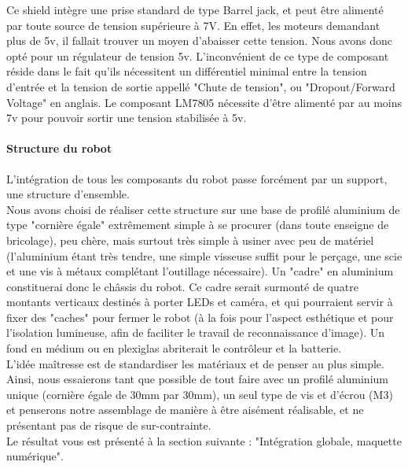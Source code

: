 			Ce shield intègre une prise standard de type Barrel jack, et peut être alimenté par toute source de tension supérieure à 7V. 
			En effet, les moteurs demandant plus de 5v, il fallait trouver un moyen d'abaisser cette tension. Nous avons donc opté pour un régulateur de tension 5v. L'inconvénient de ce type de composant réside dans le fait qu'ils nécessitent un différentiel minimal entre la tension d'entrée et la tension de sortie appellé "Chute de tension", ou "Dropout/Forward Voltage" en anglais. Le composant LM7805 nécessite d'être alimenté par au moins 7v \cite{bib21} pour pouvoir sortir une tension stabilisée à 5v.





		\paragraph{Structure du robot}

			L'intégration de tous les composants du robot passe forcément par un support, une structure d'ensemble.\\
			Nous avons choisi de réaliser cette structure sur une base de profilé aluminium de type "cornière égale" extrêmement simple à se procurer (dans toute enseigne de bricolage), peu chère, mais surtout très simple à usiner avec peu de matériel (l'aluminium étant très tendre, une simple visseuse suffit pour le perçage, une scie et une vis à métaux complétant l'outillage nécessaire).
			Un "cadre" en aluminium constituerai donc le châssis du robot. Ce cadre serait surmonté de quatre montants verticaux destinés à porter LEDs et caméra, et qui pourraient servir à fixer des "caches" pour fermer le robot (à la fois pour l'aspect esthétique et pour l'isolation lumineuse, afin de faciliter le travail de reconnaissance d'image). Un fond en médium ou en plexiglas abriterait le contrôleur et la batterie.\\

			L'idée maîtresse est de standardiser les matériaux et de penser au plus simple. Ainsi, nous essaierons tant que possible de tout faire avec un profilé aluminium unique (cornière égale de 30mm par 30mm), un seul type de vis et d'écrou (M3) et penserons notre assemblage de manière à être aisément réalisable, et ne présentant pas de risque de sur-contrainte.\\

			Le résultat vous est présenté à la section suivante : "Intégration globale, maquette numérique".


